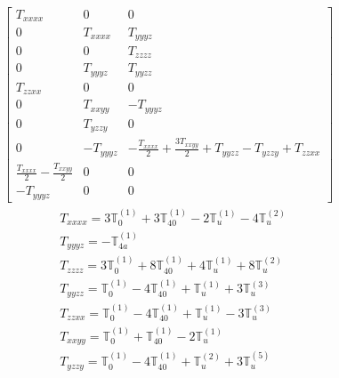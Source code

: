 \documentclass[fleqn,8pt,landscape]{jsarticle}
\begin{document}
\begin{align*}
\begin{bmatrix} T_{xxxx} & 0 & 0 \\ 0 & T_{xxxx} & T_{yyyz} \\ 0 & 0 & T_{zzzz} \\ 0 & T_{yyyz} & T_{yyzz} \\ T_{zzxx} & 0 & 0 \\ 0 & T_{xxyy} & - T_{yyyz} \\ 0 & T_{yzzy} & 0 \\ 0 & - T_{yyyz} & - \frac{T_{xxxx}}{2} + \frac{3 T_{xxyy}}{2} + T_{yyzz} - T_{yzzy} + T_{zzxx} \\ \frac{T_{xxxx}}{2} - \frac{T_{xxyy}}{2} & 0 & 0 \\ - T_{yyyz} & 0 & 0 \end{bmatrix}
\end{align*}
\begin{align*}
& T_{xxxx} = 3 \mathbb{T}_{0}^{(1)} + 3 \mathbb{T}_{40}^{(1)} - 2 \mathbb{T}_{u}^{(1)} - 4 \mathbb{T}_{u}^{(2)} \\
& T_{yyyz} = - \mathbb{T}_{4a}^{(1)} \\
& T_{zzzz} = 3 \mathbb{T}_{0}^{(1)} + 8 \mathbb{T}_{40}^{(1)} + 4 \mathbb{T}_{u}^{(1)} + 8 \mathbb{T}_{u}^{(2)} \\
& T_{yyzz} = \mathbb{T}_{0}^{(1)} - 4 \mathbb{T}_{40}^{(1)} + \mathbb{T}_{u}^{(1)} + 3 \mathbb{T}_{u}^{(3)} \\
& T_{zzxx} = \mathbb{T}_{0}^{(1)} - 4 \mathbb{T}_{40}^{(1)} + \mathbb{T}_{u}^{(1)} - 3 \mathbb{T}_{u}^{(3)} \\
& T_{xxyy} = \mathbb{T}_{0}^{(1)} + \mathbb{T}_{40}^{(1)} - 2 \mathbb{T}_{u}^{(1)} \\
& T_{yzzy} = \mathbb{T}_{0}^{(1)} - 4 \mathbb{T}_{40}^{(1)} + \mathbb{T}_{u}^{(2)} + 3 \mathbb{T}_{u}^{(5)}
\end{align*}
\end{document}
